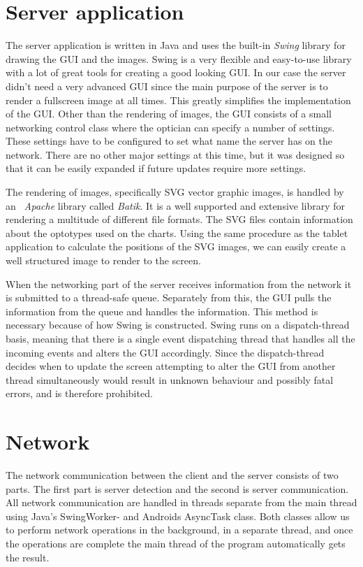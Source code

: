 \documentclass[12pt,a4paper,notitlepage]{report}
\begin{document}
\section{Server application}
The server application is written in Java and uses the built-in \textit{Swing} library for drawing the GUI and the images. Swing is a very flexible and easy-to-use library with a lot of great tools for creating a good looking GUI. In our case the server didn't need a very advanced GUI since the main purpose of the server is to render a fullscreen image at all times. This greatly simplifies the implementation of the GUI. Other than the rendering of images, the GUI consists of a small networking control class where the optician can specify a number of settings. These settings have to be configured to set what name the server has on the network. There are no other major settings at this time, but it was designed so that it can be easily expanded if future updates require more settings.

The rendering of images, specifically SVG vector graphic images, is handled by an \textit{~Apache} library called \textit{Batik}. It is a well supported and extensive library for rendering a multitude of different file formats. The SVG files contain information about the optotypes used on the charts. Using the same procedure as the tablet application to calculate the positions of the SVG images, we can easily create a well structured image to render to the screen.

When the networking part of the server receives information from the network it is submitted to a thread-safe queue. Separately from this, the GUI pulls the information from the queue and handles the information. This method is necessary because of how Swing is constructed. Swing runs on a dispatch-thread basis, meaning that there is a single event dispatching thread that handles all the incoming events and alters the GUI accordingly. Since the dispatch-thread decides when to update the screen attempting to alter the GUI from another thread simultaneously would result in unknown behaviour and possibly fatal errors, and is therefore prohibited. 

\section{Network}
The network communication between the client and the server consists of two parts. The first part is server detection and the second is server communication. All network communication are handled in threads separate from the main thread using Java's SwingWorker- and Androids AsyncTask class. Both classes allow us to perform network operations in the background, in a separate thread, and once the operations are complete the main thread of the program automatically gets the result.
\end{document}
